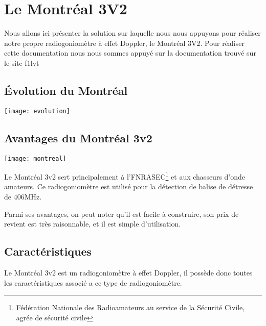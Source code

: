 \chapter{Le Montréal 3V2}
\label{montreal}

Nous allons ici présenter la solution sur laquelle nous nous appuyons pour réaliser notre propre radiogoniomètre à effet Doppler, le Montréal 3V2.
Pour réaliser cette documentation nous nous sommes appuyé sur la documentation trouvé sur le site f1lvt \cite{montreal}

\section{Évolution du Montréal}

\texttt{[image: evolution]}

\section{Avantages du Montréal 3v2}

\begin{center}
  \texttt{[image: montreal]}
\end{center}

Le Montréal 3v2 sert principalement à l'FNRASEC\footnote{Fédération Nationale des Radioamateurs au service de la Sécurité Civile, agrée de sécurité civile} et aux chasseurs d'onde amateurs. Ce radiogoniomètre est utilisé pour la détection de balise de détresse de 406MHz.

Parmi ses avantages, on peut noter qu'il est facile à construire, son prix de revient est très raisonnable, et il est simple d'utilisation. 


\section{Caractéristiques}

Le Montréal 3v2 est un radiogoniomètre à effet Doppler, il possède donc toutes les caractéristiques associé a ce type de radiogoniomètre.
~\\

